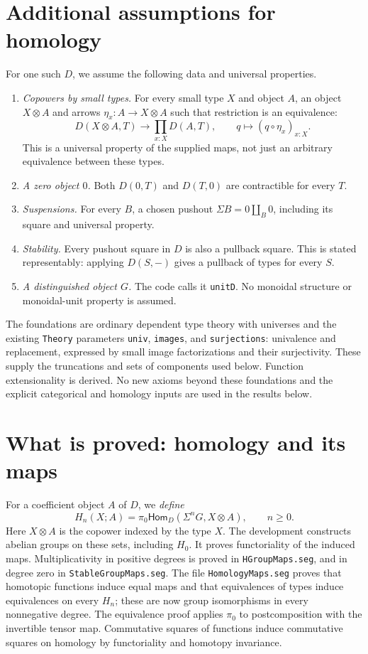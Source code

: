 \documentclass[11pt]{amsart}
\newcommand{\code}[1]{\nolinkurl{#1}}
\newcommand{\Hom}{\mathsf{Hom}}
\begin{document}
\section{Additional assumptions for homology}
For one such $D$, we assume the following data and universal properties.
\begin{enumerate}
\item \emph{Copowers by small types.} For every small type $X$ and object
$A$, an object $X\otimes A$ and arrows $\eta_x:A\to X\otimes A$ such that
restriction is an equivalence:
\[
 D(X\otimes A,T)\longrightarrow\prod_{x:X}D(A,T),
 \qquad q\longmapsto(q\circ\eta_x)_{x:X}.
\]
This is a universal property of the supplied maps, not just an arbitrary
equivalence between these types.
\item \emph{A zero object $0$.} Both $D(0,T)$ and $D(T,0)$ are
contractible for every $T$.
\item \emph{Suspensions.} For every $B$, a chosen pushout
$\Sigma B=0\amalg_B0$, including its square and universal property.
\item \emph{Stability.} Every pushout square in $D$ is also a pullback
square. This is stated representably: applying $D(S,-)$ gives a pullback
of types for every $S$.
\item \emph{A distinguished object $G$.} The code calls it
\code{unitD}. No monoidal structure or monoidal-unit property is assumed.
\end{enumerate}
The foundations are ordinary dependent type theory with universes and
the existing \code{Theory} parameters \code{univ}, \code{images}, and
\code{surjections}: univalence and replacement, expressed by small image
factorizations and their surjectivity. These supply the truncations and
sets of components used below. Function extensionality is derived.
No new axioms beyond these foundations and the explicit categorical and
homology inputs are used in the results below.

\section{What is proved: homology and its maps}
For a coefficient object $A$ of $D$, we \emph{define}
\[
 H_n(X;A)=\pi_0\Hom_D(\Sigma^nG,X\otimes A),\qquad n\geq0.
\]
Here $X\otimes A$ is the copower indexed by the type $X$.
The development constructs abelian groups on these sets, including $H_0$.
It proves functoriality of the induced maps. Multiplicativity in positive
degrees is proved in \code{HGroupMaps.seg}, and in degree zero in
\code{StableGroupMaps.seg}. The file \code{HomologyMaps.seg} proves that
homotopic functions induce equal maps and that equivalences of types
induce equivalences on every $H_n$; these are now group isomorphisms in
every nonnegative degree. The equivalence proof applies $\pi_0$ to postcomposition
with the invertible tensor map. Commutative squares of functions induce
commutative squares on homology by functoriality and homotopy invariance.
\end{document}
